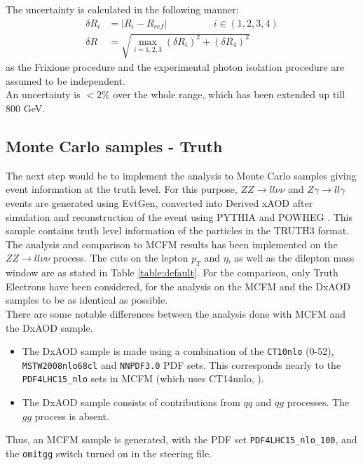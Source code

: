 \documentclass[11pt,a4paper,final]{report}
\newcommand{\ZZ}{$ZZ\rightarrow ll\nu\nu$ }
\begin{document}
The uncertainty is calculated in the following manner:
\begin{equation}
\begin{split}
\delta R_i &= |R_i - R_{ref}| \hspace{2cm}  i \in (1,2,3,4)\\
\delta R &= \sqrt{\max_{i=1,2,3}(\delta R_i)^2 + (\delta R_4)^2}
\end{split}
\end{equation}
as the Frixione procedure and the experimental photon isolation procedure are assumed to be independent.\\
An uncertainty is $< 2\%$ over the whole range, which has been extended up till 800 GeV.

\subsection*{Monte Carlo samples - Truth}
\label{subsec:MC_truth}
The next step would be to implement the analysis to Monte Carlo samples giving event information at the truth level. For this purpose, $ZZ\rightarrow ll\nu\nu$ and $Z\gamma \rightarrow ll\gamma$ events are generated using EvtGen\cite{evtgen}, converted into Derived xAOD after simulation and reconstruction of the event using PYTHIA \cite{pythia} and POWHEG \cite{powheg}. This sample contains truth level information of the particles in the TRUTH3 format.\\
The analysis and comparison to MCFM results has been implemented on the \ZZ process. The cuts on the lepton $p_T$ and $\eta$, as well as the dilepton mass window are as stated in Table \ref{table:default}. For the comparison, only Truth Electrons have been considered, for the analysis on the MCFM and the DxAOD samples to be as identical as possible.\\
There are some notable differences between the analysis done with MCFM and the DxAOD sample.
\begin{itemize}
	\item The DxAOD sample is made using a combination of the \texttt{CT10nlo} (0-52), \texttt{MSTW2008nlo68cl} and \texttt{NNPDF3.0} PDF sets. This corresponds nearly to the \texttt{PDF4LHC15\_nlo} sets in MCFM (which uses CT14nnlo, ).
	\item The DxAOD sample consists of contributions from $qq$ and $qg$ processes. The $gg$ process is absent.
\end{itemize}
Thus, an MCFM sample is generated, with the PDF set \texttt{PDF4LHC15\_nlo\_100}, and the \texttt{omitgg} switch turned on in the steering file.
\end{document}
